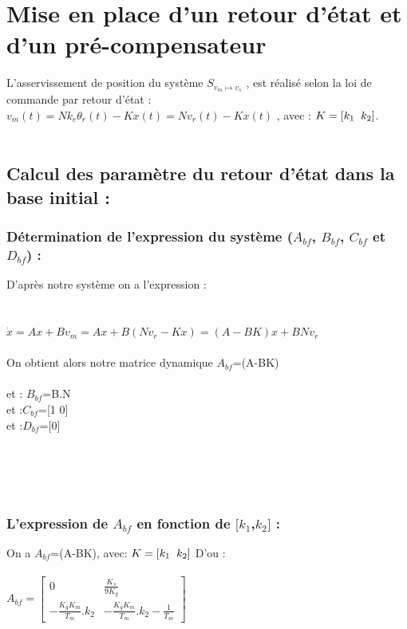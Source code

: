 

 \chapter{Mise en place d'un retour d'état et d'un pré-compensateur}

L'asservissement de position du système $S_{v_{m}\longmapsto v_{s}}$ , est réalisé selon la loi de commande par retour d'état :\\
 $v_{m}(t)=Nk_{e}\theta_{r}(t)-Kx(t)=Nv_{r}(t)-Kx(t)$ , avec : $K=[k_{1} \hspace{2mm} k_{2}]$.\\\\
 
 \section{Calcul des paramètre du retour d'état dans la base initial :}
 
\subsection{Détermination de l'expression du système ($A_{bf}$, $B_{bf}$, $C_{bf}$ et $D_{bf}$) :}

D'après notre système on a l'expression :\\
\\\\
$\dot{x}=Ax+Bv_{m}=Ax+B(Nv_{r}-Kx)=(A-BK)x+BNv_{r}$
\\\\
On obtient alors notre matrice dynamique \quad $A_{bf}$=(A-BK)\\
\\
et : \quad $B_{bf}$=B.N \\
 et :\quad $C_{bf}$=[1 0] \\
 et :\quad $D_{bf}$=[0] \\\\\\\\\\

\subsection{L'expression de $A_{bf}$ en fonction de $[k_{1}$,$k_{2}]$ : }

On a $A_{bf}$=(A-BK),  avec: $K=[k_{1} \hspace{2mm} k_{2}]$
D'ou :\\\\
$A_{bf}=
\begin{bmatrix} 
0 & \frac{K_{s}}{9K_{g}} \\
-\frac{K_{g}K_{m}}{T_{m}}.k_{2} & -\frac{K_{g}K_{m}}{T_{m}}.k_{2}-\frac{1}{T_{m}}
\end{bmatrix}$ \\\\

